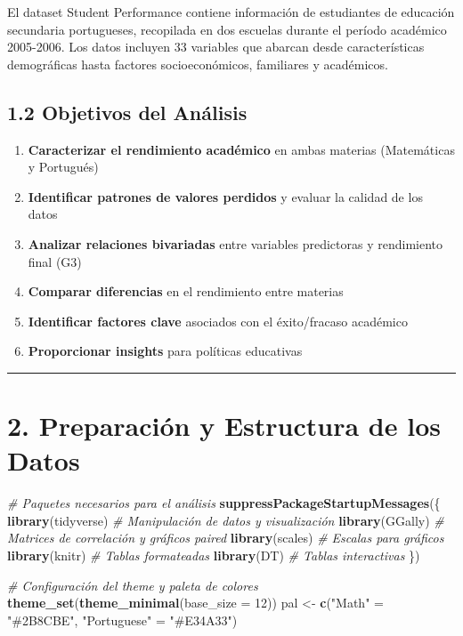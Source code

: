 \documentclass[
]{book}
\newenvironment{Shaded}{\begin{snugshade}}{\end{snugshade}}
\newcommand{\AttributeTok}[1]{\textcolor[rgb]{0.13,0.29,0.53}{#1}}
\newcommand{\CommentTok}[1]{\textcolor[rgb]{0.56,0.35,0.01}{\textit{#1}}}
\newcommand{\DecValTok}[1]{\textcolor[rgb]{0.00,0.00,0.81}{#1}}
\newcommand{\FunctionTok}[1]{\textcolor[rgb]{0.13,0.29,0.53}{\textbf{#1}}}
\newcommand{\NormalTok}[1]{#1}
\newcommand{\OtherTok}[1]{\textcolor[rgb]{0.56,0.35,0.01}{#1}}
\newcommand{\StringTok}[1]{\textcolor[rgb]{0.31,0.60,0.02}{#1}}
\providecommand{\tightlist}{%
  \setlength{\itemsep}{0pt}\setlength{\parskip}{0pt}}
\begin{document}
El dataset Student Performance contiene información de estudiantes de educación secundaria portugueses, recopilada en dos escuelas durante el período académico 2005-2006. Los datos incluyen 33 variables que abarcan desde características demográficas hasta factores socioeconómicos, familiares y académicos.

\subsection{1.2 Objetivos del Análisis}\label{objetivos-del-anuxe1lisis}

\begin{enumerate}
\def\labelenumi{\arabic{enumi}.}
\tightlist
\item
  \textbf{Caracterizar el rendimiento académico} en ambas materias (Matemáticas y Portugués)
\item
  \textbf{Identificar patrones de valores perdidos} y evaluar la calidad de los datos
\item
  \textbf{Analizar relaciones bivariadas} entre variables predictoras y rendimiento final (G3)
\item
  \textbf{Comparar diferencias} en el rendimiento entre materias
\item
  \textbf{Identificar factores clave} asociados con el éxito/fracaso académico
\item
  \textbf{Proporcionar insights} para políticas educativas
\end{enumerate}

\begin{center}\rule{0.5\linewidth}{0.5pt}\end{center}

\section{2. Preparación y Estructura de los Datos}\label{preparaciuxf3n-y-estructura-de-los-datos}

\begin{Shaded}
\begin{Highlighting}[]
\CommentTok{\# Paquetes necesarios para el análisis}
\FunctionTok{suppressPackageStartupMessages}\NormalTok{(\{}
  \FunctionTok{library}\NormalTok{(tidyverse)    }\CommentTok{\# Manipulación de datos y visualización}
  \FunctionTok{library}\NormalTok{(GGally)       }\CommentTok{\# Matrices de correlación y gráficos paired}
  \FunctionTok{library}\NormalTok{(scales)       }\CommentTok{\# Escalas para gráficos}
  \FunctionTok{library}\NormalTok{(knitr)        }\CommentTok{\# Tablas formateadas}
  \FunctionTok{library}\NormalTok{(DT)           }\CommentTok{\# Tablas interactivas}
\NormalTok{\})}

\CommentTok{\# Configuración del theme y paleta de colores}
\FunctionTok{theme\_set}\NormalTok{(}\FunctionTok{theme\_minimal}\NormalTok{(}\AttributeTok{base\_size =} \DecValTok{12}\NormalTok{))}
\NormalTok{pal }\OtherTok{\textless{}{-}} \FunctionTok{c}\NormalTok{(}\StringTok{"Math"} \OtherTok{=} \StringTok{"\#2B8CBE"}\NormalTok{, }\StringTok{"Portuguese"} \OtherTok{=} \StringTok{"\#E34A33"}\NormalTok{)}
\end{Highlighting}
\end{Shaded}
\end{document}

